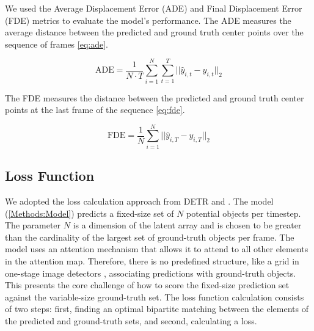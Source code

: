 We used the Average Displacement Error (ADE) and Final Displacement Error (FDE) metrics to evaluate the model's performance. The ADE measures the average distance between the predicted and ground truth center points over the sequence of frames \ref{eq:ade}.

\begin{equation}
    \text{ADE} = \frac{1}{N \cdot T} \sum_{i=1}^{N} \sum_{t=1}^{T} || \hat{y}_{i,t} - y_{i,t} ||_2
    \label{eq:ade}
\end{equation}

The FDE measures the distance between the predicted and ground truth center points at the last frame of the sequence \ref{eq:fde}.

\begin{equation}
    \text{FDE} = \frac{1}{N} \sum_{i=1}^{N} || \hat{y}_{i,T} - y_{i,T} ||_2
    \label{eq:fde}
\end{equation}

\subsection{Loss Function} \label{Methods:LossFunction}

We adopted the loss calculation approach from DETR \cite{carionEndtoEndObjectDetection2020} and \cite{stewartEndtoendPeopleDetection2015}. The model (\ref{Methods:Model}) predicts a fixed-size set of $N$ potential objects per timestep. The parameter $N$ is a dimension of the latent array and is chosen to be greater than the cardinality of the largest set of ground-truth objects per frame. The model uses an attention mechanism that allows it to attend to all other elements in the attention map. Therefore, there is no predefined structure, like a grid in one-stage image detectors \cite{redmonYouOnlyLook2016}, associating predictions with ground-truth objects. This presents the core challenge of how to score the fixed-size prediction set against the variable-size ground-truth set. The loss function calculation consists of two steps: first, finding an optimal bipartite matching between the elements of the predicted and ground-truth sets, and second, calculating a loss.


